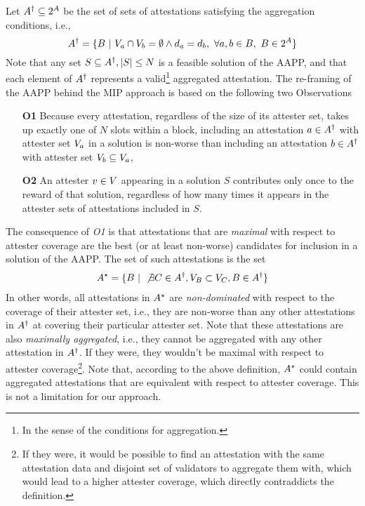 \documentclass{article}
\begin{document}
Let $A^{\dagger} \subseteq 2^{A}$ be the set of
sets of attestations satisfying the aggregation conditions, i.e.,
%
\begin{equation}
  A^{\dagger} = \{ B~|~V_{a} \cap V_{b} = \emptyset
  \land d_{a} = d_{b},~\forall a, b \in B,~B \in 2^{A} \}
\end{equation}
%
Note that any set $S \subseteq A^{\dagger}, |S| \leq N$ is a
feasible solution of the AAPP, and that each element of
$A^{\dagger}$ represents a valid\footnote{In the sense of the
conditions for aggregation.} aggregated attestation. The re-framing of the AAPP
behind the MIP approach is based on the following two Observations
%
\begin{enumerate}
  \item[\textbf{O1}] Because every attestation, regardless of the size of its
  attester set, takes up exactly one of $N$ slots within a block, including an
  attestation $a \in A^{\dagger}$ with attester set $V_{a}$
  in a solution is non-worse than including an attestation $b \in
  A^{\dagger}$ with attester set $V_{b} \subseteq
  V_{a}$,
  \item[\textbf{O2}] An attester $v \in V$ appearing in a
  solution $S$ contributes only once to the reward of that solution, regardless
  of how many times it appears in the attester sets of attestations included in
  $S$.
\end{enumerate}
%
The consequence of \emph{O1} is that attestations that are \emph{maximal} with
respect to attester coverage are the best (or at least non-worse) candidates
for inclusion in a solution of the AAPP. The set of such attestations is the
set
%
\begin{align}
  A^{\star} = \{ B~|~\not\exists C \in A^{\dagger},
  V_{B} \subset V_{C}, B \in A^{\dagger} \}
\end{align}
%
In other words, all attestations in $A^{\star}$ are
\emph{non-dominated} with respect to the coverage of their attester set, i.e.,
they are non-worse than any other attestations in $A^{\dagger}$ at
covering their particular attester set. Note that these attestations are also
\emph{maximally aggregated}, i.e., they cannot be aggregated with any other
attestation in $A^{\dagger}$. If they were, they wouldn't be
maximal with respect to attester coverage\footnote{If they were, it would be
possible to find an attestation with the same attestation data and disjoint set
of validators to aggregate them with, which would lead to a higher attester
coverage, which directly contraddicts the definition.}. Note that, according to
the above definition, $A^{\star}$ could contain aggregated
attestations that are equivalent with respect to attester coverage. This is not
a limitation for our approach.
\end{document}

